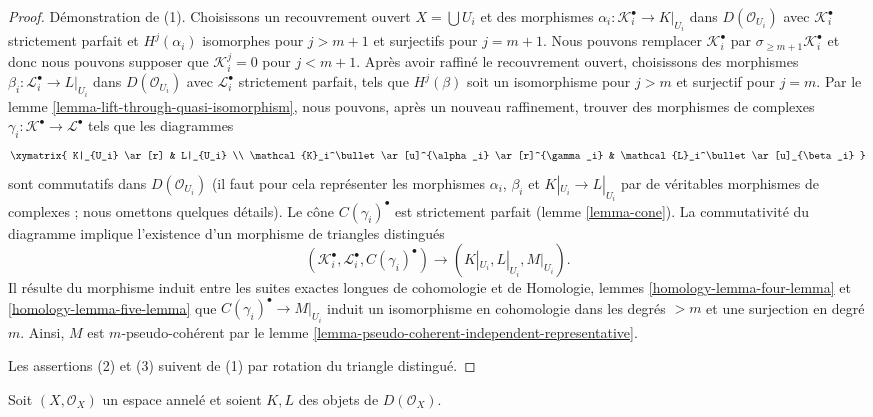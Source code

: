 {\begin{proof}
Démonstration de (1). Choisissons un recouvrement ouvert $X = \bigcup U_i$ et des morphismes $\alpha_i : \mathcal{K}_i^\bullet \to K|_{U_i}$ dans $D(\mathcal{O}_{U_i})$
avec $\mathcal{K}_i^\bullet$ strictement parfait et $H^j(\alpha_i)$
isomorphes pour $j > m + 1$ et surjectifs pour $j = m + 1$. Nous pouvons remplacer $\mathcal{K}_i^\bullet$ par
$\sigma_{\geq m + 1}\mathcal{K}_i^\bullet$
et donc nous pouvons supposer que $\mathcal{K}_i^j = 0$
pour $j < m + 1$. Après avoir raffiné le recouvrement ouvert, choisissons des morphismes $\beta_i : \mathcal{L}_i^\bullet \to L|_{U_i}$ dans $D(\mathcal{O}_{U_i})$
avec $\mathcal{L}_i^\bullet$ strictement parfait, tels que
$H^j(\beta)$ soit un isomorphisme pour $j > m$ et surjectif pour $j = m$. Par le lemme \ref{lemma-lift-through-quasi-isomorphism},
nous pouvons, après un nouveau raffinement, trouver des morphismes de complexes
$\gamma_i : \mathcal{K}^\bullet \to \mathcal{L}^\bullet$
tels que les diagrammes
$$
\xymatrix{
K|_{U_i} \ar[r] & L|_{U_i} \\
\mathcal{K}_i^\bullet \ar[u]^{\alpha_i} \ar[r]^{\gamma_i} &
\mathcal{L}_i^\bullet \ar[u]_{\beta_i}
}
$$
sont commutatifs dans $D(\mathcal{O}_{U_i})$ (il faut pour cela représenter les morphismes $\alpha_i$, $\beta_i$ et $K|_{U_i} \to L|_{U_i}$
par de véritables morphismes de complexes ; nous omettons quelques détails). Le cône $C(\gamma_i)^\bullet$ est strictement parfait (lemme \ref{lemma-cone}). La commutativité du diagramme implique l'existence d'un morphisme de triangles distingués
$$
(\mathcal{K}_i^\bullet, \mathcal{L}_i^\bullet, C(\gamma_i)^\bullet)
\longrightarrow
(K|_{U_i}, L|_{U_i}, M|_{U_i}).
$$
Il résulte du morphisme induit entre les suites exactes longues de cohomologie et de Homologie, lemmes \ref{homology-lemma-four-lemma} et
\ref{homology-lemma-five-lemma}
que $C(\gamma_i)^\bullet \to M|_{U_i}$ induit un isomorphisme en cohomologie dans les degrés $> m$ et une surjection en degré $m$. Ainsi, $M$ est $m$-pseudo-cohérent par le lemme \ref{lemma-pseudo-coherent-independent-representative}.

\medskip\noindent

Les assertions (2) et (3) suivent de (1) par rotation du triangle distingué.

\end{proof}

\begin{lemma}

\label{lemma-tensor-pseudo-coherent}

Soit $(X, \mathcal{O}_X)$ un espace annelé et soient $K, L$ des objets de $D(\mathcal{O}_X)$.


\end{lemma}}
